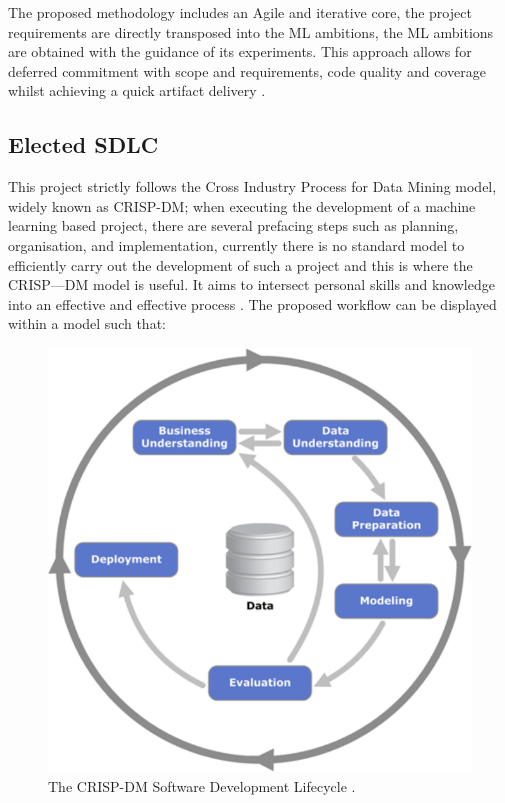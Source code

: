 The proposed methodology includes an Agile and iterative core, the project requirements are directly transposed into the ML ambitions, the ML ambitions are obtained with the guidance of its experiments. This approach allows for deferred commitment with scope and requirements, code quality and coverage whilst achieving a quick artifact delivery \parencite{pinhasi2021mldc}.

\subsection{Elected SDLC}

This project strictly follows the Cross Industry Process for Data Mining model, widely known as CRISP-DM; when executing the development of a machine learning based project, there are several prefacing steps such as planning, organisation, and implementation, currently there is no standard model to efficiently carry out the development of such a project and this is where the CRISP---DM model is useful. It aims to intersect personal skills and knowledge into an effective and effective process \parencite{wirth2000crisp}. The proposed workflow can be displayed within a model such that:

\begin{figure}[H]
    \centering
    \includegraphics[width=\textwidth]{figures/chapter-3/CRISP-DM1.pdf}
    \caption[CRISP-DM Lifecycle]{The CRISP-DM Software Development Lifecycle \parencite{jenson2012crisp}.
    \label{fig:CRISP-DM}}
\end{figure}

